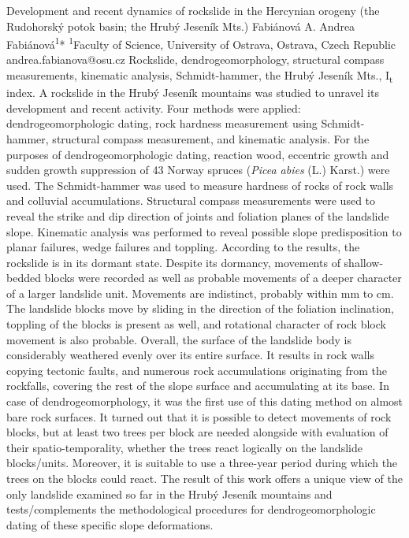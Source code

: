 \abstract
{Development and recent dynamics of rockslide in the Hercynian orogeny (the Rudohorský potok basin; the Hrubý Jeseník Mts.)} 
{Fabiánová A.} 
{Andrea Fabiánová\textsuperscript{1}*} 
{\KLtag} 
{
\textsuperscript{1}Faculty of Science, University of Ostrava, Ostrava, Czech Republic
}
{andrea.fabianova@osu.cz}  %
{Rockslide, dendrogeomorphology, structural compass measurements, kinematic analysis, Schmidt-hammer, the Hrubý Jeseník Mts., I\textsubscript{t} index.}
{A rockslide in the Hrubý Jeseník mountains was studied to unravel its development and recent activity. Four methods were applied: dendrogeomorphologic dating, rock hardness measurement using Schmidt-hammer, structural compass measurement, and kinematic analysis. For the purposes of dendrogeomorphologic dating, reaction wood, eccentric growth and sudden growth suppression of 43 Norway spruces (\textit{Picea abies} (L.) Karst.) were used. The Schmidt-hammer was used to measure hardness of rocks of rock walls and colluvial accumulations. Structural compass measurements were used to reveal the strike and dip direction of joints and foliation planes of the landslide slope. Kinematic analysis was performed to reveal possible slope predisposition to planar failures, wedge failures and toppling. According to the results, the rockslide is in its dormant state. Despite its dormancy, movements of shallow-bedded blocks were recorded as well as probable movements of a deeper character of a larger landslide unit. Movements are indistinct, probably within mm to cm. The landslide blocks move by sliding in the direction of the foliation inclination, toppling of the blocks is present as well, and rotational character of rock block movement is also probable. Overall, the surface of the landslide body is considerably weathered evenly over its entire surface. It results in rock walls copying tectonic faults, and numerous rock accumulations originating from the rockfalls, covering the rest of the slope surface and accumulating at its base. In case of dendrogeomorphology, it was the first use of this dating method on almost bare rock surfaces. It turned out that it is possible to detect movements of rock blocks, but at least two trees per block are needed alongside with evaluation of their spatio-temporality, whether the trees react logically on the landslide blocks/units. Moreover, it is suitable to use a three-year period during which the trees on the blocks could react. The result of this work offers a unique view of the only landslide examined so far in the Hrubý Jeseník mountains and tests/complements the methodological procedures for dendrogeomorphologic dating of these specific slope deformations.
}
{
}

